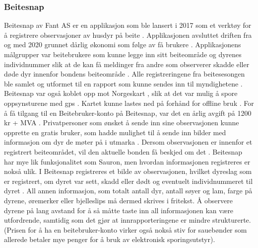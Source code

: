 \subsubsection{Beitesnap}
Beitesnap av Fant AS er en applikasjon som ble lansert i 2017 som et verktøy for å registrere observasjoner av husdyr på beite \cite{BeitesnapRevolusjonerendeVerktoy}. Applikasjonen avsluttet driften fra og med 2020 grunnet dårlig økonomi som følge av få brukere \cite{BeiteSnapFacebook2020}. Applikasjonens målgrupper var beitebrukere som kunne legge inn sitt beiteområde og dyrenes individnummer slik at de kan få meldinger fra andre som observerer skadde eller døde dyr innenfor bondens beiteområde \cite{BeitesnapRevolusjonerendeVerktoy}. Alle registreringene fra beitesesongen ble samlet og utformet til en rapport som kunne sendes inn til myndighetene \cite{BeitesnapRevolusjonerendeVerktoy}. Beitesnap var også koblet opp mot Norgeskart \cite{NorgeskartKartverketNo}, slik at det var mulig å spore oppsynsturene med \acrshort{gps} \cite{BeiteSnapFacebook2020}. Kartet kunne lastes ned på forhånd for offline bruk \cite{BeitesnapRevolusjonerendeVerktoy}. For å få tilgang til en Beitebruker-konto på Beitesnap, var det en årlig avgift på 1200 kr + MVA \cite{BeitesnapRevolusjonerendeVerktoy}. Privatpersoner som ønsket å sende inn sine observasjonen kunne opprette en gratis bruker, som hadde mulighet til å sende inn bilder med informasjon om dyr de møter på i utmarka \cite{BeitesnapRevolusjonerendeVerktoy}. Dersom observasjonen er innenfor et registrert beiteområdet, vil den aktuelle bonden få beskjed om det \cite{BeitesnapRevolusjonerendeVerktoy}. 
\newline
\newline
Beitesnap har mye lik funksjonalitet som Sauron, men hvordan informasjonen registreres er nokså ulik. I Beitesnap registreres et bilde av observasjonen, hvilket dyreslag som er registrert, om dyret var sett, skadd eller dødt og eventuelt individnummeret til dyret \cite{beitesnapKomplettBrukermanualBeitebrukere2017}. All annen informasjon, som totalt antall dyr, antall søyer og lam, farge på dyrene, øremerker eller bjelleslips må dermed skrives i fritekst. Å observere dyrene på lang avstand for å så måtte taste inn all informasjonen kan være utfordrende, samtidig som det gjør at innrapporteringene er mindre strukturerte. (Prisen for å ha en beitebruker-konto virker også nokså stiv for sauebønder som allerede betaler mye penger for å bruk av elektronisk sporingsutstyr). 

